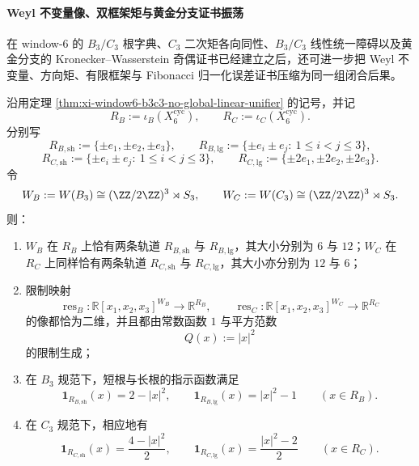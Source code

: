 \paragraph{Weyl 不变量像、双框架矩与黄金分支证书振荡}
在 window-\(6\) 的 \(B_3/C_3\) 根字典、\(C_3\) 二次矩各向同性、\(B_3/C_3\) 线性统一障碍以及黄金分支的 Kronecker--Wasserstein 奇偶证书已经建立之后，还可进一步把 Weyl 不变量、方向矩、有限框架与 Fibonacci 归一化误差证书压缩为同一组闭合后果。

\begin{theorem}\label{thm:xi-window6-b3c3-weyl-invariant-image-quadratic}
沿用定理 \ref{thm:xi-window6-b3c3-no-global-linear-unifier} 的记号，并记
\[
R_B:=\iota_B(X_6^{\mathrm{cyc}}),
\qquad
R_C:=\iota_C(X_6^{\mathrm{cyc}}).
\]
分别写
\[
R_{B,\mathrm{sh}}:=\{\pm e_1,\pm e_2,\pm e_3\},
\qquad
R_{B,\mathrm{lg}}:=\{\pm e_i\pm e_j:\ 1\le i<j\le 3\},
\]
\[
R_{C,\mathrm{sh}}:=\{\pm e_i\pm e_j:\ 1\le i<j\le 3\},
\qquad
R_{C,\mathrm{lg}}:=\{\pm 2e_1,\pm 2e_2,\pm 2e_3\}.
\]
令
\[
W_B:=W(B_3)\cong (\ZZ/2\ZZ)^3\rtimes S_3,
\qquad
W_C:=W(C_3)\cong (\ZZ/2\ZZ)^3\rtimes S_3.
\]
则：
\begin{enumerate}
  \item \(W_B\) 在 \(R_B\) 上恰有两条轨道 \(R_{B,\mathrm{sh}}\) 与 \(R_{B,\mathrm{lg}}\)，其大小分别为 \(6\) 与 \(12\)；\(W_C\) 在 \(R_C\) 上同样恰有两条轨道 \(R_{C,\mathrm{sh}}\) 与 \(R_{C,\mathrm{lg}}\)，其大小亦分别为 \(12\) 与 \(6\)；
  \item 限制映射
  \[
  \operatorname{res}_B:\mathbb R[x_1,x_2,x_3]^{W_B}\to \mathbb R^{R_B},
  \qquad
  \operatorname{res}_C:\mathbb R[x_1,x_2,x_3]^{W_C}\to \mathbb R^{R_C}
  \]
  的像都恰为二维，并且都由常数函数 \(1\) 与平方范数
  \[
  Q(x):=|x|^2
  \]
  的限制生成；
  \item 在 \(B_3\) 规范下，短根与长根的指示函数满足
  \[
  \boxed{\;
  \mathbf 1_{R_{B,\mathrm{sh}}}(x)=2-|x|^2,
  \qquad
  \mathbf 1_{R_{B,\mathrm{lg}}}(x)=|x|^2-1
  \qquad(x\in R_B).\;}
  \]
  \item 在 \(C_3\) 规范下，相应地有
  \[
  \boxed{\;
  \mathbf 1_{R_{C,\mathrm{sh}}}(x)=\frac{4-|x|^2}{2},
  \qquad
  \mathbf 1_{R_{C,\mathrm{lg}}}(x)=\frac{|x|^2-2}{2}
  \qquad(x\in R_C).\;}
  \]
\end{enumerate}
\end{theorem}
